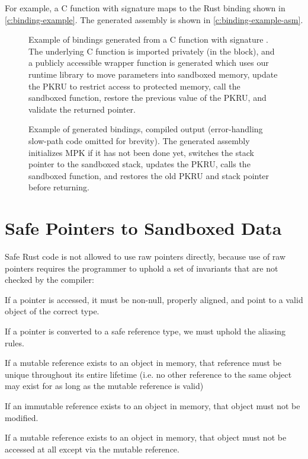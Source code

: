 For example, a C function with signature  maps to the Rust binding shown
in \autoref{c:binding-example}. The generated assembly is shown in \autoref{c:binding-example-asm}.

\begin{figure}[ht]

\coderule
\caption[Example of generated Rust bindings to a C function]{
    Example of bindings generated from a C function with signature .
    The underlying C function is imported privately (in the  block), and a publicly
    accessible wrapper function is generated which uses our runtime library to move parameters into
    sandboxed memory, update the PKRU to restrict access to protected memory, call the sandboxed
    function, restore the previous value of the PKRU, and validate the returned pointer.
}
\label{c:binding-example}
\end{figure}


\begin{figure}[ht]

\coderule
\caption[Example of generated Rust bindings to a C function, compiled output]{Example of generated
    bindings, compiled output (error-handling slow-path code omitted for brevity). The generated
    assembly initializes MPK if it has not been done yet, switches the stack pointer to the
    sandboxed stack, updates the PKRU, calls the sandboxed function, and restores the old PKRU and
    stack pointer before returning.}
\label{c:binding-example-asm}
\end{figure}

\section{Safe Pointers to Sandboxed Data}
\label{s:aliasing}

Safe Rust code is not allowed to use raw pointers directly, because use of raw pointers requires the
programmer to uphold a set of invariants that are not checked by the compiler:

\squishlist
    \item If a pointer is accessed, it must be non-null, properly aligned,
        and point to a valid object of the correct type.
    \item If a pointer is converted to a safe reference type, we must uphold the aliasing rules.
    \squishlist
        \item If a mutable reference exists to an object in memory, that reference must be unique
            throughout its entire lifetime (i.e. no other reference to the same object may exist for
            as long as the mutable reference is valid)
        \item If an immutable reference exists to an object in memory, that object must not be modified.
        \item If a mutable reference exists to an object in memory, that object must not be accessed
            at all except via the mutable reference.
    \squishend
\squishend

